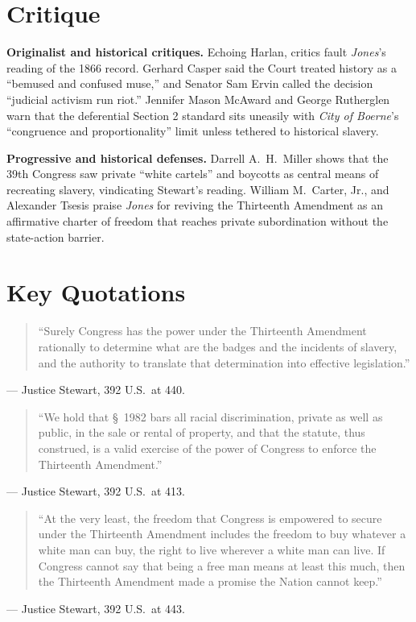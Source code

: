 \documentclass[12pt]{article}
\begin{document}
\section{Critique}

\textbf{Originalist and historical critiques.} Echoing Harlan, critics fault \textit{Jones}'s reading of the 1866 record. Gerhard Casper said the Court treated history as a ``bemused and confused muse,'' and Senator Sam Ervin called the decision ``judicial activism run riot.'' Jennifer Mason McAward and George Rutherglen warn that the deferential Section 2 standard sits uneasily with \textit{City of Boerne}'s ``congruence and proportionality'' limit unless tethered to historical slavery.

\textbf{Progressive and historical defenses.} Darrell A.\ H.\ Miller shows that the 39th Congress saw private ``white cartels'' and boycotts as central means of recreating slavery, vindicating Stewart's reading. William M.\ Carter, Jr., and Alexander Tsesis praise \textit{Jones} for reviving the Thirteenth Amendment as an affirmative charter of freedom that reaches private subordination without the state-action barrier.

\section{Key Quotations}

\begin{quote}
``Surely Congress has the power under the Thirteenth Amendment rationally to determine what are the badges and the incidents of slavery, and the authority to translate that determination into effective legislation.''
\end{quote}
\noindent --- Justice Stewart, 392 U.S.\ at 440.

\begin{quote}
``We hold that \S~1982 bars all racial discrimination, private as well as public, in the sale or rental of property, and that the statute, thus construed, is a valid exercise of the power of Congress to enforce the Thirteenth Amendment.''
\end{quote}
\noindent --- Justice Stewart, 392 U.S.\ at 413.

\begin{quote}
``At the very least, the freedom that Congress is empowered to secure under the Thirteenth Amendment includes the freedom to buy whatever a white man can buy, the right to live wherever a white man can live. If Congress cannot say that being a free man means at least this much, then the Thirteenth Amendment made a promise the Nation cannot keep.''
\end{quote}
\noindent --- Justice Stewart, 392 U.S.\ at 443.
\end{document}
